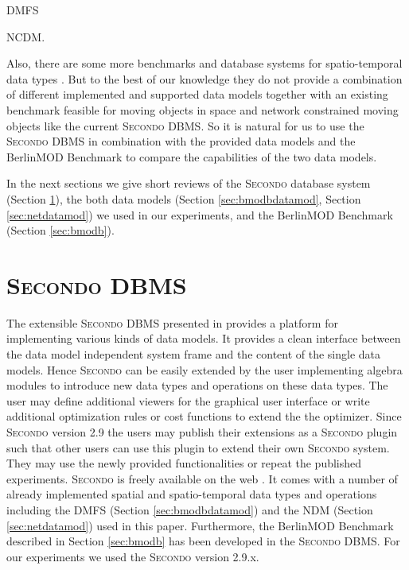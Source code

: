 \documentclass[a4paper]{article}
\newcommand{\secondo}{\textsc{Secondo}}
\newcommand{\bmodb} {BerlinMOD Benchmark}
\newcommand{\secver}{2.9.x}
\begin{document}
DMFS\cite{STAUPelekis,HERMESPelekis,RepresentingMovingObjectsGueting,DataModelDataStructureGueting,sqlstchen}


NCDM\cite{NetworkGueting,NetworkJensen,NetworkVazirgiannis,DynamicTransportationNetworkDing}.



Also, there are some more
benchmarks \cite{COSTBenchmarkJensen,QueriesTheodoridis} and database systems for
spatio-temporal data types \cite{SecondoPlatformPrototypingGueting,HERMESPelekis}. But to the best of our
knowledge they do not provide a combination of different implemented
and supported data models together with an existing benchmark feasible for moving
objects in space and network constrained moving objects like the current \secondo{} DBMS.
So it is natural for us to use the \secondo{} DBMS in combination with the provided
data models and the \bmodb{} to compare the capabilities of the two data models.

In the next sections we give short reviews of the \secondo{} database system
(Section \ref{sec:secondo}), the both data models (Section \ref{sec:bmodbdatamod},
Section \ref{sec:netdatamod}) we used in our experiments, and the \bmodb{}
(Section \ref{sec:bmodb}).
\section{\secondo{} DBMS}
\label{sec:secondo}
The extensible \secondo{} DBMS presented in \cite{SecondoEnvironmentDieker,SecondoPlatformPrototypingGueting} provides a
platform for implementing various kinds of data models. It provides a clean
interface between the data model independent system frame and the content of the
single data models. Hence \secondo{} can be easily extended by the user
implementing algebra modules to introduce new data types and operations on
these data types. The user may define additional viewers for the graphical user
interface or write additional optimization rules or cost functions to extend the
the optimizer. Since \secondo{} version 2.9 the users may publish their extensions
as a \secondo{} plugin such that other users can use this plugin to extend their own
\secondo{} system. They may use the newly provided functionalities or repeat the
published experiments. \secondo{} is freely available on the web \cite{secondoweb}.
It comes with a number of already implemented spatial and spatio-temporal data types
and operations including the DMFS (Section \ref{sec:bmodbdatamod}) and the NDM
(Section \ref{sec:netdatamod}) used in this paper. Furthermore, the \bmodb{}
described in Section \ref{sec:bmodb} has been developed in the \secondo{} DBMS.
For our experiments we used the \secondo{} version \secver{}.
\end{document}

